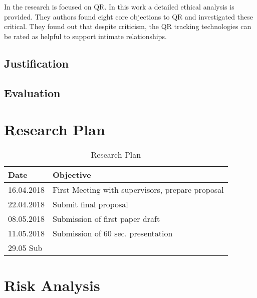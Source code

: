 \documentclass[journal]{vgtc}                %
\begin{document}
In \cite{doi:10.1080/15265161.2017.1409823} the research is focused on \ac{QR}. In this work a detailed ethical analysis is provided. They authors found eight core objections to \acs{QR} and investigated these critical. They found out that despite criticism, the \acs{QR} tracking technologies can be rated as helpful to support intimate relationships.


\subsection{Justification}

\subsection{Evaluation}

\section{Research Plan}

\begin{table}[H]
  \caption{Research Plan}
  \label{tab:vis_accept}
  \scriptsize
  \begin{center}
    \begin{tabular}{ll}
      Date & Objective \\
    \hline
      16.04.2018 &  First Meeting  with supervisors, prepare proposal \\
      22.04.2018 & Submit final proposal \\
      08.05.2018 & Submission of first paper draft \\
      11.05.2018 & Submission of 60 sec. presentation \\
      29.05 Sub
	\end{tabular}
  \end{center}
\end{table}


\section{Risk Analysis}

\printbibliography
\end{document}
